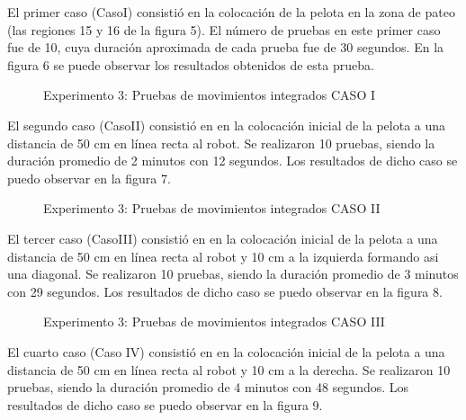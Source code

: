El  primer caso (CasoI) consistió en la colocación de la pelota en la zona de pateo (las regiones 15 y 16 de la figura 5). El número de pruebas en este primer caso fue de 10, cuya duración aproximada de cada prueba fue de 30 segundos. En la figura 6 se puede observar los resultados obtenidos de esta prueba.

\begin{figure}
\caption{Experimento 3: Pruebas de movimientos integrados CASO I}
\end{figure}

El segundo caso  (CasoII) consistió en en la colocación inicial de la pelota a una distancia de 50 cm en línea recta al robot. Se realizaron 10 pruebas, siendo la duración promedio de 2 minutos con 12 segundos. Los resultados de dicho caso se puedo observar en la figura 7. 

\begin{figure}
\caption{Experimento 3: Pruebas de movimientos integrados CASO II}
\end{figure}

El tercer caso  (CasoIII) consistió en en la colocación inicial de la pelota a una distancia de 50 cm en línea recta al robot y 10 cm a la izquierda formando asi una diagonal. Se realizaron 10 pruebas, siendo la duración promedio de 3 minutos con 29 segundos. Los resultados de dicho caso se puedo observar en la figura 8. 

\begin{figure}
\caption{Experimento 3: Pruebas de movimientos integrados CASO III}
\end{figure}

El cuarto caso  (Caso IV) consistió en en la colocación inicial de la pelota a una distancia de 50 cm en línea recta al robot y 10 cm a la derecha. Se realizaron 10 pruebas, siendo la duración promedio de 4 minutos con 48 segundos.  Los resultados de dicho caso se puedo observar en la figura 9. 


